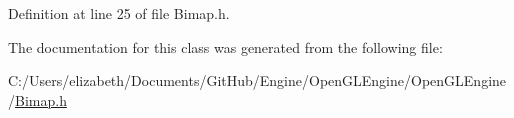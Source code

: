 Definition at line 25 of file Bimap.\+h.



The documentation for this class was generated from the following file\+:\begin{DoxyCompactItemize}
\item 
C\+:/\+Users/elizabeth/\+Documents/\+Git\+Hub/\+Engine/\+Open\+G\+L\+Engine/\+Open\+G\+L\+Engine/\hyperlink{_bimap_8h}{Bimap.\+h}\end{DoxyCompactItemize}
